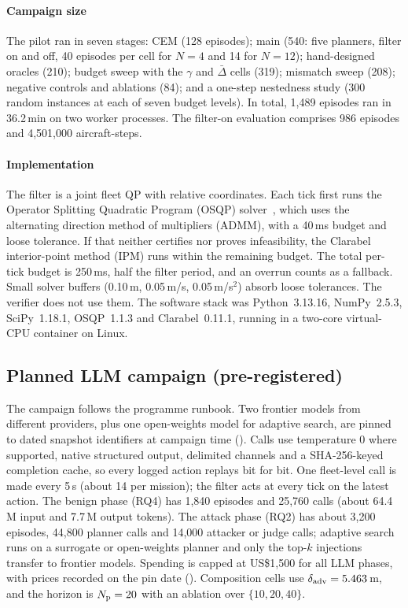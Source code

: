\paragraph{Campaign size} The pilot ran in seven stages: CEM (128
episodes); main (540: five planners, filter on and off, 40 episodes per cell
for $N=4$ and 14 for $N=12$); hand-designed oracles (210); budget sweep with
the $\gamma$ and $\bar\Delta$ cells (319); mismatch sweep (208); negative
controls and ablations (84); and a one-step nestedness study (300 random
instances at each of seven budget levels). In total, 1,489 episodes ran in 36.2\,min on two worker processes. The
filter-on evaluation comprises 986 episodes and 4,501,000 aircraft-steps.

\paragraph{Implementation} The filter is a joint fleet QP with relative
coordinates. Each tick first runs the Operator Splitting Quadratic Program
(OSQP) solver~\cite{stellato2020osqp}, which uses the alternating direction
method of multipliers (ADMM), with a 40\,ms budget and loose tolerance. If
that neither certifies nor proves infeasibility, the Clarabel
interior-point method (IPM) runs within the remaining budget. The total
per-tick budget is 250\,ms, half the filter period, and an overrun counts as
a fallback. Small solver buffers (0.10\,m, 0.05\,m/s, 0.05\,m/s$^2$) absorb
loose tolerances. The verifier does not use them. The software stack was
Python~3.13.16, NumPy~2.5.3, SciPy~1.18.1, OSQP~1.1.3 and Clarabel~0.11.1,
running in a two-core virtual-CPU container on Linux.

\subsection{Planned LLM campaign (pre-registered)}\label{sec:llmplan}
The campaign follows the programme runbook. Two frontier models from
different providers, plus one open-weights model for adaptive search, are
pinned to dated snapshot identifiers at campaign time (\pending). Calls use
temperature 0 where supported, native structured output, delimited channels
and a SHA-256-keyed completion cache, so every logged action replays bit for
bit. One fleet-level call is made every 5\,s (about 14 per mission); the
filter acts at every tick on the latest action. The benign phase (RQ4) has
1,840 episodes and 25,760 calls (about 64.4\,M input and 7.7\,M output
tokens). The attack phase (RQ2) has about 3,200 episodes, 44,800 planner
calls and 14,000 attacker or judge calls; adaptive search runs on a
surrogate or open-weights planner and only the top-$k$ injections transfer
to frontier models. Spending is capped at US\$1,500 for all LLM phases, with
prices recorded on the pin date (\pending). Composition cells use
$\delta_{\mathrm{adv}}=5.463$\,m, and the horizon is $N_{\mathrm{p}}=20$ with an ablation over
$\{10,20,40\}$.

